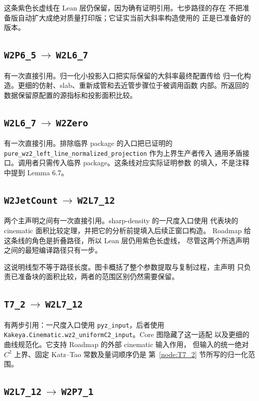 \documentclass[UTF8,11pt,a4paper,fontset=none]{ctexart}
\DeclareRobustCommand{\id}[1]{\nolinkurl{#1}}
\newcommand{\arr}[2]{\id{#1}\,$\longrightarrow$\,\id{#2}}
\begin{document}
这条紫色长虚线在 Lean 层仍保留，因为确有证明引用。七步路径的存在
不把准备版自动扩大成绝对质量打印版；它证实当前大斜率构造使用的
正是已准备好的版本。

\subsection{\texorpdfstring{\arr{W2P6_5}{W2L6_7}}{W2P6\_5 到 W2L6\_7}}

有一次直接引用。归一化小投影入口把实际保留的大斜率最终配置传给
归一化构造。更细的仿射、slab、重新成管和去近管步骤位于被调用函数
内部。所返回的数据保留原配置的源指标和投影面积比较。

\subsection{\texorpdfstring{\arr{W2L6_7}{W2Zero}}{W2L6\_7 到 W2Zero}}

有一次直接引用。排除临界 package 的入口把已证明的
\id{pure_wz2_left_line_normalized_projection} 作为上界生产者传入
通用矛盾接口。调用者只需传入临界 package。这条线对应实际证明参数
的填入，不是注释中提到 Lemma 6.7。

\subsection{\texorpdfstring{\arr{W2JetCount}{W2L7_12}}{W2JetCount 到 W2L7\_12}}

两个主声明之间有一次直接引用。sharp-density 的一尺度入口使用
代表块的 cinematic 面积比较定理，并把它的分析前提填入后续正窗口构造。
Roadmap 给这条线的角色是折叠路径，所以 Lean 层仍用紫色长虚线，
尽管这两个所选声明之间的最短编译路径只有一步。

这说明线型不等于路径长度。图卡概括了整个参数提取与复制过程，主声明
只负责已准备块的面积比较，两者的范围区别仍然需要保留。

\subsection{\texorpdfstring{\arr{T7_2}{W2L7_12}}{T7\_2 到 W2L7\_12}}

有两步引用：一尺度入口使用 \id{pyz_input}，后者使用
\id{Kakeya.Cinematic.wz2_uniformC2_input}。Core 图隐藏了这一适配
以及更细的曲线规范化。它支持 Roadmap 的外部 cinematic 输入作用，
但输入的统一绝对 $C^2$ 上界、固定 Katz--Tao 常数及量词顺序仍是
第~\ref{node:T7_2} 节所写的归一化范围。

\subsection{\texorpdfstring{\arr{W2L7_12}{W2P7_1}}{W2L7\_12 到 W2P7\_1}}
\end{document}

